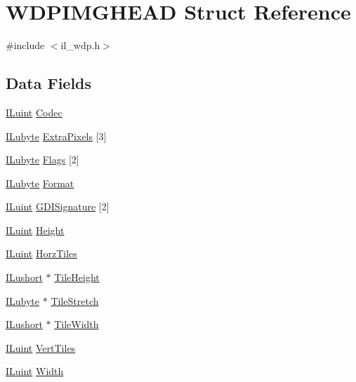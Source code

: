 \hypertarget{struct_w_d_p_i_m_g_h_e_a_d}{\section{W\-D\-P\-I\-M\-G\-H\-E\-A\-D Struct Reference}
\label{struct_w_d_p_i_m_g_h_e_a_d}
}


{\ttfamily \#include $<$il\-\_\-wdp.\-h$>$}

\subsection*{Data Fields}
\begin{DoxyCompactItemize}
\item 
\hyperlink{il_8h_ac6508d0e9c19e32f32e00d54b5b8cf30}{I\-Luint} \hyperlink{struct_w_d_p_i_m_g_h_e_a_d_ad6ec8558006b5ea2c786cf3111640ca1}{Codec}
\item 
\hyperlink{il_8h_a8d2f04500100a86d1b00e98ab1b15a33}{I\-Lubyte} \hyperlink{struct_w_d_p_i_m_g_h_e_a_d_a46cc04516b9c6e88786a1f0fc217af15}{Extra\-Pixels} \mbox{[}3\mbox{]}
\item 
\hyperlink{il_8h_a8d2f04500100a86d1b00e98ab1b15a33}{I\-Lubyte} \hyperlink{struct_w_d_p_i_m_g_h_e_a_d_a7c091b95fbab65a415b248f1d0186443}{Flags} \mbox{[}2\mbox{]}
\item 
\hyperlink{il_8h_a8d2f04500100a86d1b00e98ab1b15a33}{I\-Lubyte} \hyperlink{struct_w_d_p_i_m_g_h_e_a_d_aa93a325ca30831f723f4a537174fc6e5}{Format}
\item 
\hyperlink{il_8h_ac6508d0e9c19e32f32e00d54b5b8cf30}{I\-Luint} \hyperlink{struct_w_d_p_i_m_g_h_e_a_d_a480199de90a414cb81cc88a95ff1947f}{G\-D\-I\-Signature} \mbox{[}2\mbox{]}
\item 
\hyperlink{il_8h_ac6508d0e9c19e32f32e00d54b5b8cf30}{I\-Luint} \hyperlink{struct_w_d_p_i_m_g_h_e_a_d_a8a8093d76b61a95fc96df24af29b107a}{Height}
\item 
\hyperlink{il_8h_ac6508d0e9c19e32f32e00d54b5b8cf30}{I\-Luint} \hyperlink{struct_w_d_p_i_m_g_h_e_a_d_ae1e8ac869aae5c2d0e22812308fd6031}{Horz\-Tiles}
\item 
\hyperlink{il_8h_af6287b43748354a7c4864da43ae56962}{I\-Lushort} $\ast$ \hyperlink{struct_w_d_p_i_m_g_h_e_a_d_ae2362dc781b9cddfe77c7a040668b72a}{Tile\-Height}
\item 
\hyperlink{il_8h_a8d2f04500100a86d1b00e98ab1b15a33}{I\-Lubyte} $\ast$ \hyperlink{struct_w_d_p_i_m_g_h_e_a_d_a19482f97b40b047ee36ea4b84ced354b}{Tile\-Stretch}
\item 
\hyperlink{il_8h_af6287b43748354a7c4864da43ae56962}{I\-Lushort} $\ast$ \hyperlink{struct_w_d_p_i_m_g_h_e_a_d_ab1f7c72e67b1460c57f9ce134df936e1}{Tile\-Width}
\item 
\hyperlink{il_8h_ac6508d0e9c19e32f32e00d54b5b8cf30}{I\-Luint} \hyperlink{struct_w_d_p_i_m_g_h_e_a_d_a7c370437eb4201894bacf3152cd6e5eb}{Vert\-Tiles}
\item 
\hyperlink{il_8h_ac6508d0e9c19e32f32e00d54b5b8cf30}{I\-Luint} \hyperlink{struct_w_d_p_i_m_g_h_e_a_d_a4146e7b2b0b4097e0e335f9b348392bf}{Width}
\end{DoxyCompactItemize}


